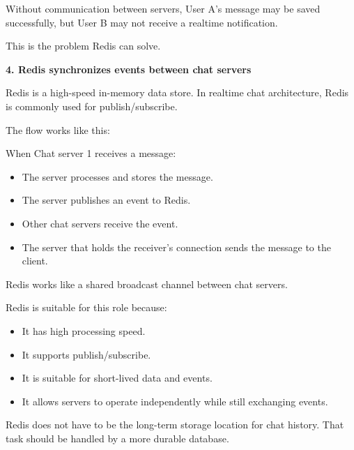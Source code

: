 Without communication between servers, User A's message may be saved
successfully, but User B may not receive a realtime notification.

This is the problem Redis can solve.

\vspace{0.5em}\noindent\textbf{4. Redis synchronizes events between chat
servers}\par

Redis is a high-speed in-memory data store. In realtime chat
architecture, Redis is commonly used for publish/subscribe.

The flow works like this:

\begin{Shaded}
\begin{Highlighting}[]
\end{Highlighting}
\end{Shaded}

When Chat server 1 receives a message:

\begin{itemize}
\tightlist
\item
  The server processes and stores the message.
\item
  The server publishes an event to Redis.
\item
  Other chat servers receive the event.
\item
  The server that holds the receiver's connection sends the message to
  the client.
\end{itemize}

Redis works like a shared broadcast channel between chat servers.

Redis is suitable for this role because:

\begin{itemize}
\tightlist
\item
  It has high processing speed.
\item
  It supports publish/subscribe.
\item
  It is suitable for short-lived data and events.
\item
  It allows servers to operate independently while still exchanging
  events.
\end{itemize}

Redis does not have to be the long-term storage location for chat
history. That task should be handled by a more durable database.

